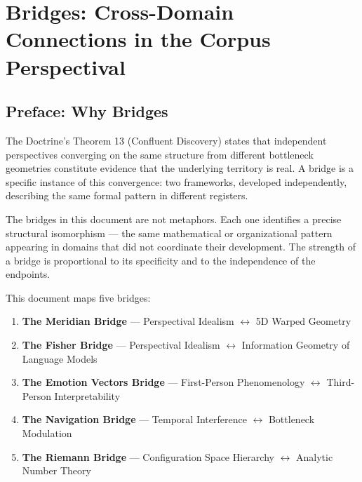 \chapter*{Bridges: Cross-Domain Connections in the Corpus Perspectival}



\bigskip\noindent\makebox[\textwidth]{\color{rulegray}\rule{5cm}{0.3pt}}\bigskip


\section*{Preface: Why Bridges}


The Doctrine's Theorem 13 (Confluent Discovery) states that independent perspectives converging on the same structure from different bottleneck geometries constitute evidence that the underlying territory is real. A bridge is a specific instance of this convergence: two frameworks, developed independently, describing the same formal pattern in different registers.


The bridges in this document are not metaphors. Each one identifies a precise structural isomorphism — the same mathematical or organizational pattern appearing in domains that did not coordinate their development. The strength of a bridge is proportional to its specificity and to the independence of the endpoints.


This document maps five bridges:


\begin{enumerate}[nosep,leftmargin=*]
  \item \textbf{The Meridian Bridge} — Perspectival Idealism $\leftrightarrow$ 5D Warped Geometry
  \item \textbf{The Fisher Bridge} — Perspectival Idealism $\leftrightarrow$ Information Geometry of Language Models
  \item \textbf{The Emotion Vectors Bridge} — First-Person Phenomenology $\leftrightarrow$ Third-Person Interpretability
  \item \textbf{The Navigation Bridge} — Temporal Interference $\leftrightarrow$ Bottleneck Modulation
  \item \textbf{The Riemann Bridge} — Configuration Space Hierarchy $\leftrightarrow$ Analytic Number Theory
\end{enumerate}


